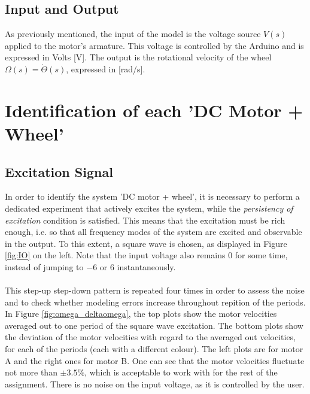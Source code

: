 \documentclass[a4paper,kul]{kulakarticle} %
\begin{document}

\subsection{Input and Output}
As previously mentioned, the input of the model is the voltage source $V(s)$ applied to the motor's armature. This voltage is controlled by the Arduino and is expressed in Volts [V]. The output is the rotational velocity of the wheel  $\Omega(s) = \dot{\Theta}(s)$, expressed in [rad/s].


\section{Identification of each 'DC Motor + Wheel'}
\subsection{Excitation Signal}
In order to identify the system 'DC motor + wheel', it is necessary to perform a dedicated experiment that actively excites the system, while the \textit{persistency of excitation} condition is satisfied. This means that the excitation must be rich enough, i.e. so that all frequency modes of the system are excited and observable in the output. To this extent, a square wave is chosen, as displayed in Figure \ref{fig:IO} on the left. Note that the input voltage also remains $0$ for some time, instead of jumping to $-6$ or $6$ instantaneously. 
\\\\
This step-up step-down pattern is repeated four times in order to assess the noise and to check whether modeling errors increase throughout repition of the periods. In Figure \ref{fig:omega_deltaomega}, the top plots show the motor velocities averaged out to one period of the square wave excitation. The bottom plots show the deviation of the motor velocities with regard to the averaged out velocities, for each of the periods (each with a different colour). The left plots are for motor A and the right ones for motor B. One can see that the motor velocities fluctuate not more than $\pm 3.5\%$, which is acceptable to work with for the rest of the assignment. There is no noise on the input voltage, as it is controlled by the user.
\end{document}
